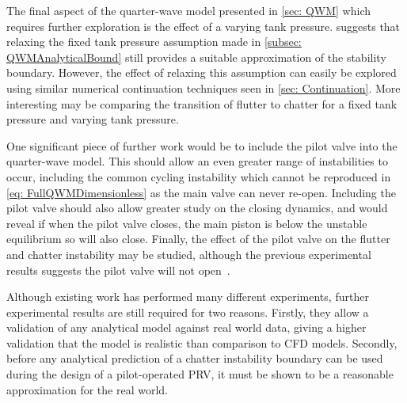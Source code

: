 The final aspect of the quarter-wave model presented in \cref{sec: QWM} which requires further exploration is the effect of a varying tank pressure.  suggests that relaxing the fixed tank pressure assumption made in \cref{subsec: QWMAnalyticalBound} still provides a suitable approximation of the stability boundary. However, the effect of relaxing this assumption can easily be explored using similar numerical continuation techniques seen in \cref{sec: Continuation}. More interesting may be comparing the transition of flutter to chatter for a fixed tank pressure and varying tank pressure.

One significant piece of further work would be to include the pilot valve into the quarter-wave model. This should allow an even greater range of instabilities to occur, including the common cycling instability which cannot be reproduced in \cref{eq: FullQWMDimensionless} as the main valve can never re-open. Including the pilot valve should also allow greater study on the closing dynamics, and would reveal if when the pilot valve closes, the main piston is below the unstable equilibrium so will also close. Finally, the effect of the pilot valve on the flutter and chatter instability may be studied, although the previous experimental results suggests the pilot valve will not open~\cite{Allison2015TestingValves}.

Although existing work has performed many different experiments, further experimental results are still required for two reasons. Firstly, they allow a validation of any analytical model against real world data, giving a higher validation that the model is realistic than comparison to CFD models. Secondly, before any analytical prediction of a chatter instability boundary can be used during the design of a pilot-operated PRV, it must be shown to be a reasonable approximation for the real world.
% 
% 